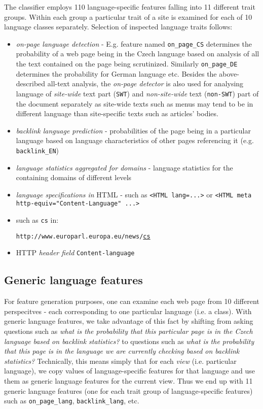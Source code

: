 \documentclass{acm_proc_article-sp}
\begin{document}
  The classifier employs 110 language-specific features falling into 11 different trait groups. Within each group a
  particular trait of a site is examined for each of 10 language classes separately. Selection of
  inspected language traits follows: 
  \begin{itemize}
    \item \textit{on-page language detection} - E.g. feature named \texttt{on\_page\_CS} determines the
      probability of a web page being in the Czech language based on analysis of all the text
      contained on the page being scrutinized. Similarly \texttt{on\_page\_DE} determines the
      probability for German language etc. Besides the above-described all-text analysis, the \textit{on-page 
      detector} is also used for analysing language of \textit{site-wide} text part (\texttt{SWT}) and
    \textit{non-site-wide} text (\texttt{non-SWT}) part of the document separately as site-wide texts 
      such as menus may tend to be in different language than site-specific texts such as articles' bodies.
    \item \textit{backlink language prediction} - probabilities of the page being in a particular
      language based on language characteristics of other pages referencing it (e.g.
      \texttt{backlink\_EN})
    \item \textit{language statistics aggregated for domains} - language statistics for the
      containing domains of different levels
    \item \textit{language specifications in} HTML - such as \texttt{<HTML lang=...>} or \texttt{<HTML
      meta http-equiv="Content-Language"  ...>}
    \item {} such as \texttt{cs} in:

    \texttt{http://www.europarl.europa.eu/news/}\underline{\texttt{cs}} 
    \item HTTP \textit{header field} \texttt{Content-language}
  \end{itemize}


\subsection{Generic language features}
    For feature generation purposes, one can examine each web page from 10 different perspecitves -
    each corresponding to one particular language (i.e. a class). With generic language features, we
    take advantage of this fact by shifting from asking questions such as \textit{what is the probability that 
    this particular page is in the Czech language based on backlink statistics?} to questions 
    such as \textit{what is the probability that this page is in the language we are currently checking 
    based on backlink statistics?} Technically, this means simply
    that for each \textit{view} (i.e. particular language), we copy values of language-specific
    features for that language and use them as generic language features for the current view. Thus
    we end up with 11 generic language features (one for each trait group of language-specific
    features) such as \texttt{on\_page\_lang}, \texttt{backlink\_lang}, etc.
\end{document}
